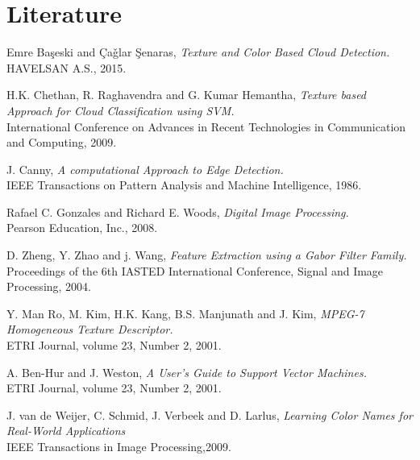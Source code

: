 \documentclass{article}
\begin{document}
\section{Literature}
\renewcommand{\section}[2]{}%
\begin{thebibliography}{9}

Emre Ba\c{s}eski and \c{C}a\v{g}lar \c{S}enaras, 
\textit{Texture and Color Based Cloud Detection.} \\
HAVELSAN A.S., 2015.
 
H.K. Chethan, R. Raghavendra and G. Kumar Hemantha, 
\textit{Texture based Approach for Cloud Classification using SVM.} \\
International Conference on Advances in Recent Technologies in Communication and Computing, 2009. 
 
J. Canny,
\textit{A computational Approach to Edge Detection.} \\
IEEE Transactions on Pattern Analysis and Machine Intelligence, 1986. 
 
Rafael C. Gonzales and Richard E. Woods,
\textit{Digital Image Processing.} \\
Pearson Education, Inc., 2008.
 
D. Zheng, Y. Zhao and j. Wang, 
\textit{Feature Extraction using a Gabor Filter Family.} \\
Proceedings of the 6th IASTED International Conference, Signal and Image Processing, 2004. 


Y. Man Ro, M. Kim, H.K. Kang, B.S. Manjunath and J. Kim,
\textit{MPEG-7 Homogeneous Texture Descriptor.} \\
ETRI Journal, volume 23, Number 2, 2001. 

A. Ben-Hur and J. Weston,
\textit{A User's Guide to Support Vector Machines.} \\
ETRI Journal, volume 23, Number 2, 2001. 

J. van de Weijer, C. Schmid, J. Verbeek and D. Larlus,
\textit{Learning Color Names for Real-World Applications} \\
IEEE Transactions in Image Processing,2009.


\end{thebibliography}
\end{document}

